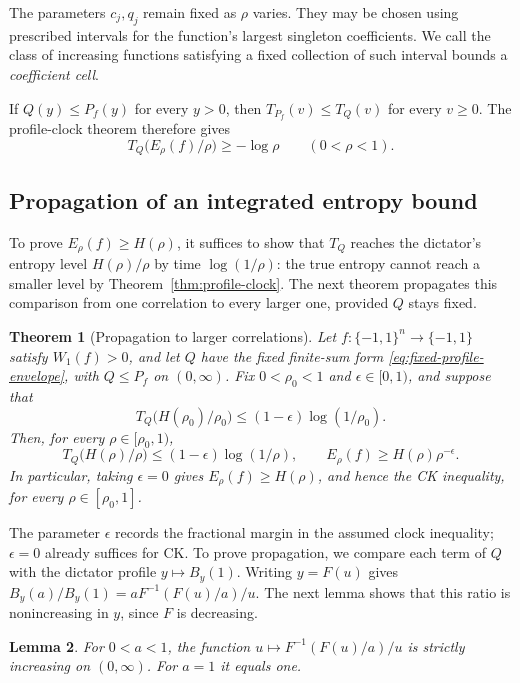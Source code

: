 \documentclass[11pt,letterpaper]{amsart}
\newcommand{\1}{\mathbf 1}
\newtheorem{theorem}{Theorem}[section]
\newtheorem{lemma}[theorem]{Lemma}
\numberwithin{equation}{section}
\begin{document}
The parameters $c_j,q_j$ remain fixed as $\rho$ varies.
They may be chosen using prescribed intervals for the function's
largest singleton coefficients. We call the class of increasing
functions satisfying a fixed collection of such interval bounds
a \emph{coefficient cell}.

If $Q(y)\le P_f(y)$ for every $y>0$, then
$T_{P_f}(v)\le T_Q(v)$ for every $v\ge0$.
The profile-clock theorem therefore gives
\[
 T_Q\bigl(E_\rho(f)/\rho\bigr)\ge-\log\rho
 \qquad(0<\rho<1).
\]

\subsection{Propagation of an integrated entropy bound}

To prove $E_\rho(f)\ge H(\rho)$, it suffices to show that $T_Q$
reaches the dictator's entropy level $H(\rho)/\rho$ by time
$\log(1/\rho)$: the true entropy cannot reach a smaller level by
Theorem~\ref{thm:profile-clock}. The next theorem propagates this
comparison from one correlation to every larger one, provided $Q$
stays fixed.

\begin{theorem}[Propagation to larger correlations]
\label{thm:clock-propagation}\label{st:clock}
Let $f:\{-1,1\}^n\to\{-1,1\}$ satisfy $W_1(f)>0$,
and let $Q$ have the fixed finite-sum form
\eqref{eq:fixed-profile-envelope}, with $Q\le P_f$ on $(0,\infty)$.
Fix $0<\rho_0<1$ and $\epsilon\in[0,1)$, and suppose that
\[
 T_Q\bigl(H(\rho_0)/\rho_0\bigr)
 \le(1-\epsilon)\log(1/\rho_0).
\]
Then, for every $\rho\in[\rho_0,1)$,
\[
 T_Q\bigl(H(\rho)/\rho\bigr)
 \le(1-\epsilon)\log(1/\rho),
 \qquad
 E_\rho(f)\ge H(\rho)\rho^{-\epsilon}.
\]
In particular, taking $\epsilon=0$ gives
$E_\rho(f)\ge H(\rho)$, and hence the CK inequality,
for every $\rho\in[\rho_0,1]$.
\end{theorem}

The parameter $\epsilon$ records the fractional margin in the
assumed clock inequality; $\epsilon=0$ already suffices for CK.
To prove propagation, we compare each term of $Q$ with the
dictator profile $y\mapsto B_y(1)$.
Writing $y=F(u)$ gives
$B_y(a)/B_y(1)=aF^{-1}(F(u)/a)/u$.
The next lemma shows that this ratio is nonincreasing in $y$,
since $F$ is decreasing.

\begin{lemma}\label{lem:profile-ratio}
For $0<a<1$, the function
$u\mapsto F^{-1}(F(u)/a)/u$ is strictly increasing on $(0,\infty)$.
For $a=1$ it equals one.
\end{lemma}
\end{document}
